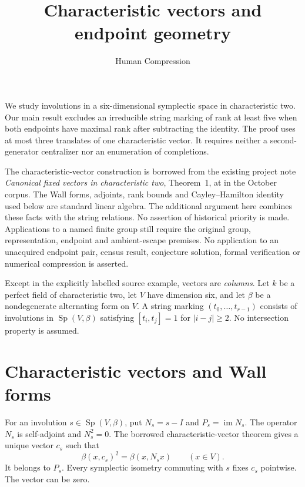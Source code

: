 \documentclass[11pt]{article}
\newcommand{\im}{\operatorname{im}}
\newcommand{\Sp}{\operatorname{Sp}}
\begin{document}
\title{Characteristic vectors and endpoint geometry}
\author{Human Compression}
\date{}
\maketitle

We study involutions in a six-dimensional symplectic space in
characteristic two. Our main result excludes an irreducible string
marking of rank at least five when both endpoints have maximal rank
after subtracting the identity. The proof uses at most three translates
of one characteristic vector. It requires neither a second-generator
centralizer nor an enumeration of completions.

The characteristic-vector construction is borrowed from the existing
project note \emph{Canonical fixed vectors in characteristic two},
Theorem~1, at
\texttt{}
in the October corpus. The Wall forms, adjoints, rank bounds and
Cayley--Hamilton identity used below are standard linear algebra.
The additional argument here combines these facts with the string
relations. No assertion of historical priority is made.
Applications to a named finite group still require the original group,
representation, endpoint and ambient-escape premises. No application
to an unacquired endpoint pair, census result, conjecture solution,
formal verification or numerical compression is asserted.

Except in the explicitly labelled source example, vectors are
\emph{columns}. Let \(k\) be a perfect field of characteristic two,
let \(V\) have dimension six, and let \(\beta\) be a nondegenerate
alternating form on \(V\). A string marking
\((t_0,\ldots,t_{r-1})\) consists of involutions in \(\Sp(V,\beta)\)
satisfying \([t_i,t_j]=1\) for \(|i-j|\geq2\).
No intersection property is assumed.

\section{Characteristic vectors and Wall forms}

For an involution \(s\in\Sp(V,\beta)\), put \(N_s=s-I\) and
\(P_s=\im N_s\). The operator \(N_s\) is self-adjoint and
\(N_s^2=0\). The borrowed characteristic-vector theorem gives a
unique vector \(c_s\) such that
\[
             \beta(x,c_s)^2=\beta(x,N_sx)
                         \qquad(x\in V).                 \tag{1}
\]
It belongs to \(P_s\). Every symplectic isometry commuting with \(s\)
fixes \(c_s\) pointwise. The vector can be zero.
\end{document}
